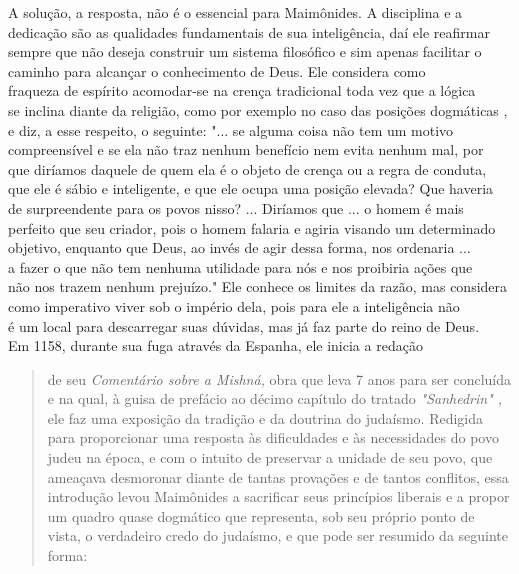 A solução, a resposta, não é o essencial para Maimônides. A disciplina
e a dedicação são as qualidades fundamentais de sua inteligência, daí
ele reafirmar
sempre que não deseja construir um sistema filosófico e sim
apenas facilitar
o caminho para alcançar o conhecimento de Deus. Ele considera
como\\
fraqueza de espírito acomodar-se na crença tradicional toda vez que a
lógica\\
se inclina diante da religião, como por exemplo no caso das posições
dogmáticas
, e diz, a esse respeito, o seguinte: "... se alguma coisa não tem um
motivo\\
compreensível e se ela não traz nenhum benefício nem evita nenhum mal,
por\\
que diríamos daquele de quem ela é o objeto de crença ou a regra de
conduta,\\
que ele é sábio e inteligente, e que ele ocupa uma posição elevada? Que
haveria\\
de surpreendente para os povos nisso? ... Diríamos que ... o homem é
mais perfeito
que seu criador, pois o homem falaria e agiria visando um
determinado\\
objetivo, enquanto que Deus, ao invés de agir dessa forma, nos ordenaria
...\\
a fazer o que não tem nenhuma utilidade para nós e nos proibiria ações
que\\
não nos trazem nenhum prejuízo." Ele conhece os limites da razão, mas
considera
como imperativo viver sob o império dela, pois para ele a
inteligência não\\
é um local para descarregar suas dúvidas, mas já faz parte do reino de
Deus.\\
Em 1158, durante sua fuga através da Espanha, ele inicia a redação

\begin{quote}de seu \emph{Comentário sobre a Mishná,} obra que leva 7 anos para ser
concluída e na qual, à guisa de prefácio ao décimo capítulo do tratado
\emph{"Sanhedrin" ,} ele faz uma exposição da tradição e da doutrina do
judaísmo. Redigida para pro­porcionar uma resposta às dificuldades e às
necessidades do povo judeu na épo­ca, e com o intuito de preservar a
unidade de seu povo, que ameaçava desmo­ronar diante de tantas provações
e de tantos conflitos, essa introdução levou Maimônides a sacrificar
seus princípios liberais e a propor um quadro quase dogmático que
representa, sob seu próprio ponto de vista, o verdadeiro credo do
judaísmo, e que pode ser resumido da seguinte forma:
\end{quote}

